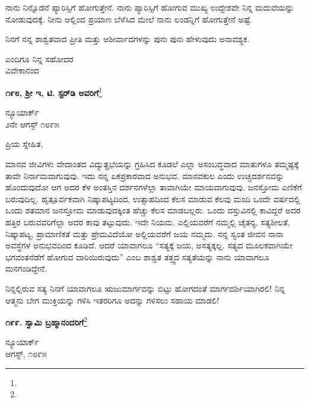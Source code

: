 ನಾನು ನಿನ್ನೊಡನೆ ಪ್ಯಾರಿಸ್ಸಿಗೆ ಹೋಗುತ್ತೇನೆ. ನಾನು ಪ್ಯಾರಿಸ್ಸಿಗೆ ಹೋಗುವ ಮುಖ್ಯ ಉದ್ದೇಶವೇ ನಿನ್ನ ಮದುವೆಯನ್ನು ನೋಡುವುದಕ್ಕೆ. ನೀನು ಅಲ್ಲಿಂದ ಪ್ರಯಾಣ ಬೆಳೆಸಿದ ಮೇಲೆ ನಾನು ಲಂಡನ್ನಿಗೆ ಹೋಗುತ್ತೇನೆ ಅಷ್ಟೆ.

ನಿನಗೆ ನನ್ನ ಶಾಶ್ವತವಾದ ಪ್ರೀತಿ ಮತ್ತು ಆಶೀರ್ವಾದಗಳನ್ನು ಪುನಃ ಪುನಃ ಹೇಳುವುದು ಅನಾವಶ್ಯಕ.

\vspace{-0.5cm}

{\flushright
ಎಂದಿಗೂ ನಿನ್ನ ಸಹೋದರ\\ವಿವೇಕಾನಂದ\par}
\vspace{-0.4cm}

\begin{center}
\textbf{೧೯೮, ಶ‍್ರೀ ಇ, ಟಿ. ಸ್ಟರ್‌ಡಿ ಅವರಿಗೆ}\footnote{}
\end{center}
\vspace{-0.6cm}

\begin{flushright}
ನ್ಯೂಯಾರ್ಕ್\\೨ನೇ ಆಗಸ್ಟ್ ೧೮೯೫
\end{flushright}
\vspace{-0.2cm}

\noindent
ಪ್ರಿಯ ಸ್ನೇಹಿತ,

ಮಾನವ ಜೀವಿಗಳು ವೇದಾಂತದ ವಿದ್ಯುತ್ಪ್ರಭೆಯನ್ನು ಗ್ರಹಿಸಿದ ಕೂಡಲೆ ಎಲ್ಲಾ ಅಸಂಬದ್ಧವಾದ ಮಾತುಗಳೂ ತಮ್ಮಷ್ಟಕ್ಕೆ ತಾವೇ ನಿರ್ನಾಮವಾಗುವುವು. ಇದು ನನ್ನ ಏಕ\break ಪ್ರಕಾರವಾದ ಅನುಭವ. ಮಾನವಕುಲ ಎಂದು ಉಚ್ಚದರ್ಶನವನ್ನು ಹೊಂದುವುದೋ ಆಗ ಅದರ ಕೆಳ ಅಂತಸ್ತಿನ ದರ್ಶನಗಳೆಲ್ಲಾ ತಾವಾಗಿಯೇ ಮಾಯವಾಗುವುವು. ಜನಸ್ತೋಮ ಎಣಿಕೆಗೆ ಬರುವುದಿಲ್ಲ. ಹೃತ್ಪೂರ್ವಕವಾಗಿ ನಿಷ್ಕಾಪಟ್ಯದಿಂದ, ಉತ್ಸಾಹದಿಂದ ಕೆಲಸ ಮಾಡುವ ಕೆಲವು ಮಂದಿ ಒಂದೇ ವರ್ಷದಲ್ಲಿ ಒಂದು ಶತಮಾನ ಜನಸ್ತೋಮ ಮಾಡುವುದಕ್ಕಿಂತ ಹೆಚ್ಚು ಕೆಲಸ ಮಾಡಬಲ್ಲರು. ಒಂದು ವಸ್ತುವಿನಲ್ಲಿ ಕಾವಿದ್ದರೆ ಅದರ ಹತ್ತಿರ ಬರುವವರಿಗೆಲ್ಲಾ ಅದರ ಕಾವು ತಟ್ಟುವುದು. ಇದೇ ನಿಯಮ. ಎಲ್ಲಿಯವರೆಗೆ ನಮ್ಮಲ್ಲಿ ಚೈತನ್ಯ, ಸತ್ಯಶೀಲತೆ, ನಿಷ್ಕಾಪಟ್ಯ, ಪ್ರಾಮಾಣಿಕತೆ ಮತ್ತು ಪ್ರೇಮವಿದೆಯೋ ಅಲ್ಲಿಯವರೆಗೆ ಜಯ ನಮ್ಮದು. ನನ್ನ ಸ್ವಂತ ಜೀವನ ನಾನಾ ಅವಸ್ಥೆಗಳ ಅನುಭವದಿಂದ ಕೂಡಿದೆ. ಆದರೆ ಯಾವಾಗಲೂ “ಸತ್ಯಕ್ಕೆ ಜಯ, ಅಸತ್ಯಕ್ಕಲ್ಲ. ಸತ್ಯದ ಮೂಲಕವಾಗಿಯೇ ಭಗವಂತನೆಡೆಗೆ ಹೋಗುವ ದಾರಿಯಿರುವುದು” ಎಂಬ ಶಾಶ್ವತ ತತ್ತ್ವದ ಸತ್ಯತೆಯನ್ನು ನಾನು ಯಾವಾಗಲೂ ಮನಗಂಡಿದ್ದೇನೆ.

ನಿನ್ನಲ್ಲಿರುವ ಸತ್ಯ ನಿನಗೆ ಯಾವಾಗಲೂ ಋಜುಮಾರ್ಗವನ್ನು ಬಿಟ್ಟು ಹೋಗದಂತೆ ಮಾರ್ಗದರ್ಶಿಯಾಗಿರಲಿ! ನಿನ್ನ ಆತ್ಮನು ಬೇಗ ಮುಕ್ತಿಯನ್ನು ಗಳಿಸಿ ಇತರರಿಗೂ ಅದನ್ನು ಗಳಿಸಲು ಸಹಾಯ ಮಾಡಲಿ!

\begin{center}
\textbf{೧೯೯. ಸ್ವಾಮಿ ಬ್ರಹ್ಮಾನಂದರಿಗೆ}\footnote{}
\end{center}
\vspace{-0.6cm}

\begin{flushright}
ನ್ಯೂಯಾರ್ಕ್\\ಆಗಸ್ಟ್, ೧೮೯೫
\end{flushright}
\vspace{-0.2cm}

